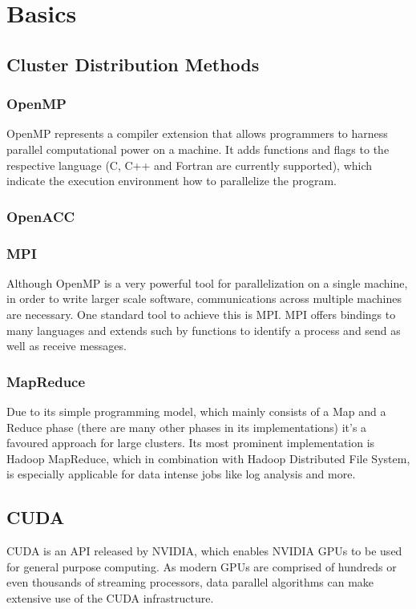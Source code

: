 \chapter{Basics}

\section{Cluster Distribution Methods}
\label{distribution_basics}

\subsection{OpenMP}
OpenMP represents a compiler extension that allows programmers to harness parallel computational power on a machine. It adds functions and flags to the respective language (C, C++ and Fortran are currently supported), which indicate the execution environment how to parallelize the program.

\subsection{OpenACC}

\subsection{MPI}
Although OpenMP is a very powerful tool for parallelization on a single machine, in order to write larger scale software, communications across multiple machines are necessary. One standard tool to achieve this is MPI.
MPI offers bindings to many languages and extends such by functions to identify a process and send as well as receive messages.

\subsection{MapReduce}
Due to its simple programming model, which mainly consists of a Map and a Reduce phase (there are many other phases in its implementations) it's a favoured approach for large clusters. Its most prominent implementation is Hadoop MapReduce, which in combination with Hadoop Distributed File System, is especially applicable for data intense jobs like log analysis and more.

\section{CUDA}

CUDA is an API released by NVIDIA, which enables NVIDIA GPUs to be used for general purpose computing. As modern GPUs are comprised of hundreds or even thousands of streaming processors, data parallel algorithms can make extensive use of the CUDA infrastructure.

